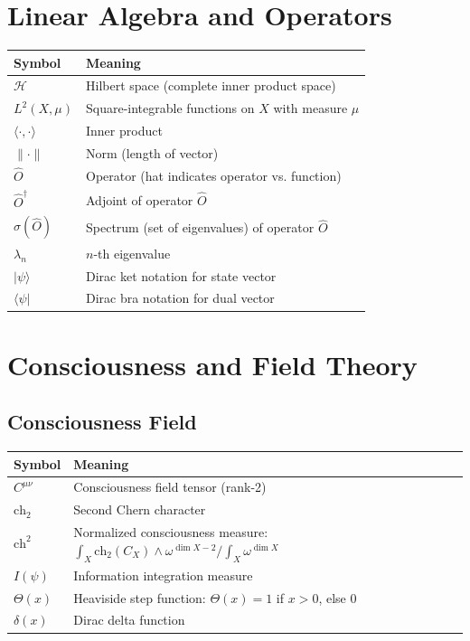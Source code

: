 \section*{Linear Algebra and Operators}

\begin{center}
\begin{tabular}{ll}
\toprule
\textbf{Symbol} & \textbf{Meaning} \\
\midrule
$\mathcal{H}$ & Hilbert space (complete inner product space) \\
$L^2(X, \mu)$ & Square-integrable functions on $X$ with measure $\mu$ \\
$\langle \cdot, \cdot \rangle$ & Inner product \\
$\|\cdot\|$ & Norm (length of vector) \\
$\hat{O}$ & Operator (hat indicates operator vs. function) \\
$\hat{O}^\dagger$ & Adjoint of operator $\hat{O}$ \\
$\sigma(\hat{O})$ & Spectrum (set of eigenvalues) of operator $\hat{O}$ \\
$\lambda_n$ & $n$-th eigenvalue \\
$|\psi\rangle$ & Dirac ket notation for state vector \\
$\langle\psi|$ & Dirac bra notation for dual vector \\
\bottomrule
\end{tabular}
\end{center}

\section*{Consciousness and Field Theory}

\subsection*{Consciousness Field}

\begin{center}
\begin{tabular}{ll}
\toprule
\textbf{Symbol} & \textbf{Meaning} \\
\midrule
$C^{\mu\nu}$ & Consciousness field tensor (rank-2) \\
$\text{ch}_2$ & Second Chern character \\
$\text{ch}^2$ & Normalized consciousness measure: $\int_X \text{ch}_2(C_X) \wedge \omega^{\dim X - 2} / \int_X \omega^{\dim X}$ \\
$I(\psi)$ & Information integration measure \\
$\Theta(x)$ & Heaviside step function: $\Theta(x) = 1$ if $x > 0$, else $0$ \\
$\delta(x)$ & Dirac delta function \\
\bottomrule
\end{tabular}
\end{center}

